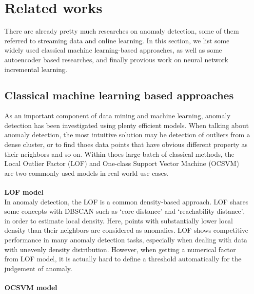 \chapter{Related works}
\label{chap:related works}

There are already pretty much researches on anomaly detection, some of them referred to streaming data and online learning. In this section, we list some widely used classical machine learning-based approaches, as well as some autoencoder based researches, and finally provious work on neural network incremental learning.

\section{Classical machine learning based approaches}
\label{sec:Classical machine learning based approaches}

As an important component of data mining and machine learning, anomaly detection has been investigated using plenty efficient models. When talking about anomaly detection, the most intuitive solution may be detection of outliers from a dense cluster, or to find thoes data points that have obvious different property as their neighbors and so on. Within thoes large batch of classical methods, the Local Outlier Factor (LOF) and One-class Support Vector Machine (OCSVM) are two commonly used models in real-world use cases.\\\\
\textbf{LOF model} \\

In anomaly detection, the LOF is a common density-based approach. LOF shares some concepts with DBSCAN such as ‘core distance’ and ‘reachability distance’, in order to estimate local density. Here, points with substantially lower local density than their neighbors are considered as anomalies. LOF shows competitive performance in many anomaly detection tasks, especially when dealing with data with unevenly density distribution. However, when getting a numerical factor from LOF model, it is actually hard to define a threshold automatically for the judgement of anomaly.\\\\

\textbf{OCSVM model} \\

